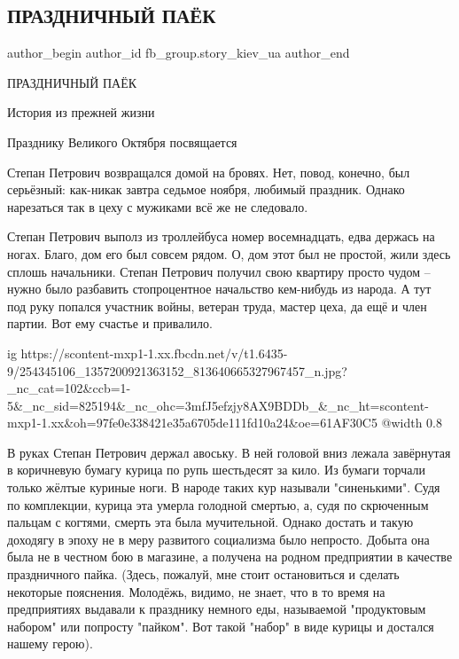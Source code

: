  
 
 
 
 
 
\subsection{ПРАЗДНИЧНЫЙ ПАЁК}
\label{sec:07_11_2021.fb.fb_group.story_kiev_ua.2.prazdnichnyj_pajek}
 
\ifcmt
 author_begin
   author_id fb_group.story_kiev_ua
 author_end
\fi

ПРАЗДНИЧНЫЙ ПАЁК

История из прежней жизни

Празднику Великого Октября посвящается

Степан Петрович возвращался домой на бровях. Нет, повод, конечно, был
серьёзный: как-никак завтра седьмое ноября, любимый праздник. Однако нарезаться
так в цеху с мужиками всё же не следовало.

Степан Петрович выполз из троллейбуса номер восемнадцать, едва держась на
ногах. Благо, дом его был совсем рядом. О, дом этот был не простой, жили здесь
сплошь начальники. Степан Петрович получил свою квартиру просто чудом – нужно
было разбавить стопроцентное начальство кем-нибудь из народа. А тут под руку
попался участник войны, ветеран труда, мастер цеха, да ещё и член партии. Вот
ему счастье и привалило.

\ifcmt
  ig https://scontent-mxp1-1.xx.fbcdn.net/v/t1.6435-9/254345106_1357200921363152_813640665327967457_n.jpg?_nc_cat=102&ccb=1-5&_nc_sid=825194&_nc_ohc=3mfJ5efzjy8AX9BDDb_&_nc_ht=scontent-mxp1-1.xx&oh=97fe0e338421e35a6705de111fd10a24&oe=61AF30C5
  @width 0.8
\fi

В руках Степан Петрович держал авоську. В ней головой вниз лежала завёрнутая в
коричневую бумагу курица по рупь шестьдесят за кило. Из бумаги торчали только
жёлтые куриные ноги. В народе таких кур называли "синенькими". Судя по
комплекции, курица эта умерла голодной смертью, а, судя по скрюченным пальцам с
когтями, смерть эта была мучительной. Однако достать и такую доходягу в эпоху
не в меру развитого социализма было непросто. Добыта она была не в честном бою
в магазине, а получена на родном предприятии в качестве праздничного пайка.
(Здесь, пожалуй, мне стоит остановиться и сделать некоторые пояснения.
Молодёжь, видимо, не знает, что в то время на предприятиях выдавали к празднику
немного еды, называемой "продуктовым набором" или попросту "пайком". Вот такой
"набор" в виде курицы и достался нашему герою).

